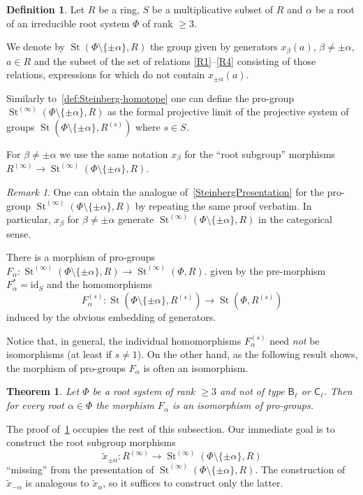 \documentclass{article}
\numberwithin{equation}{section}
\newtheorem{theorem}{Theorem}
\theoremstyle{definition}
\newtheorem{df}[lemma]{Definition} \Crefname{df}{Definition}{Definitions}
\theoremstyle{remark}
\newtheorem{rem}[lemma]{Remark}
\DeclareMathOperator\St{St}
\newcommand{\rB}{\mathsf{B}}
\newcommand{\rC}{\mathsf{C}}
\begin{document}
\begin{df}
Let $R$ be a ring, $S$ be a multiplicative subset of $R$ and $\alpha$ be a root of an irreducible root system $\Phi$ of rank $\geq 3$. 

We denote by $\St(\Phi\setminus\{\pm \alpha\}, R)$ the group given by generators $x_\beta(a)$, $\beta \neq \pm \alpha$, $a\in R$ and the subset of the set of relations \eqref{R1}--\eqref{R4} consisting of those relations, expressions for which do not contain $x_{\pm\alpha}(a)$.

Similarly to~\cref{def:Steinberg-homotope} one can define the pro-group $\St^{(\infty)}(\Phi \setminus\{\pm \alpha\}, R)$ as
the formal projective limit of the projective system of groups $\St(\Phi\setminus\{\pm \alpha\}, R^{(s)})$ where $s\in S$.
\end{df}

For $\beta \neq \pm\alpha$ we use the same notation $x_\beta$ for the ``root subgroup'' morphisms $R^{(\infty)}\to \St^{(\infty)}(\Phi \setminus\{\pm\alpha\}, R)$.
\begin{rem} \label{rem:xpma-presentation}
 One can obtain the analogue of~\cref{SteinbergPresentation} for the pro-group $\St^{(\infty)}(\Phi\setminus\{\pm\alpha\}, R)$ by repeating the same proof verbatim. In particular, $x_\beta$ for $\beta\neq \pm\alpha$ generate $\St^{(\infty)}(\Phi\setminus\{\pm\alpha\}, R)$ in the categorical sense.
\end{rem}
There is a morphism of pro-groups
$F_\alpha \colon \St^{(\infty)}(\Phi \setminus\{\pm\alpha\}, R) \to \St^{(\infty)}(\Phi, R).$
given by the pre-morphism $F_\alpha^{*} = \mathrm{id}_S$ and the homomorphisms \[F_\alpha^{(s)} \colon \St(\Phi \setminus\{\pm\alpha\}, R^{(s)}) \to \St(\Phi, R^{(s)})\] induced by the obvious embedding of generators.

Notice that, in general, the individual homomorphisms $F_\alpha^{(s)}$ need {\it not} be isomorphisms (at least if $s \neq 1$). On the other hand, as the following result shows, the morphism of pro-groups $F_\alpha$ is often an isomorphism. 
\begin{theorem}\label{SingleRootElimination}
 Let \(\Phi\) be a root system of rank \(\geq 3\) and not of type \(\rB_\ell\) or \(\rC_\ell\). Then for every root \(\alpha \in \Phi\) the morphism $F_\alpha$ is an isomorphism of pro-groups.
\end{theorem}
The proof of~\cref{SingleRootElimination} occupies the rest of this subsection.
Our immediate goal is to construct the root subgroup morphisms
\[\widetilde x_{\pm \alpha} \colon R^{(\infty)} \to \St^{(\infty)}(\Phi \setminus \{\pm \alpha\}, R) \] ``missing'' from the presentation of $\St^{(\infty)}(\Phi\setminus\{\pm\alpha\}, R)$. The construction of $\widetilde{x}_{-\alpha}$ is analogous to $\widetilde{x}_\alpha$, so it suffices to construct only the latter.
\end{document}
